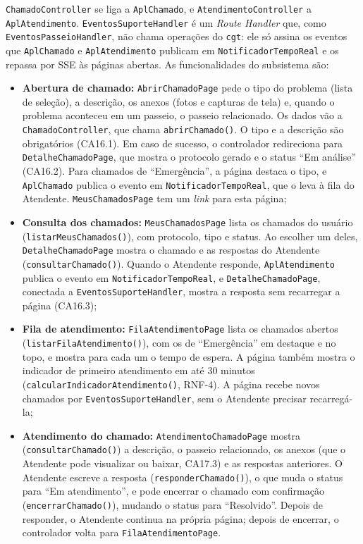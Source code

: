 \begin{sloppypar}
\texttt{ChamadoController} se liga a \texttt{AplChamado}, e \texttt{AtendimentoController} a \texttt{AplAtendimento}. \texttt{EventosSuporteHandler} é um \textit{Route Handler} que, como \texttt{EventosPasseioHandler}, não chama operações do \texttt{cgt}: ele só assina os eventos que \texttt{AplChamado} e \texttt{AplAtendimento} publicam em \texttt{NotificadorTempoReal} e os repassa por SSE às páginas abertas. As funcionalidades do subsistema são:

\begin{itemize}
	\item \textbf{Abertura de chamado:} \texttt{AbrirChamadoPage} pede o tipo do problema (lista de seleção), a descrição, os anexos (fotos e capturas de tela) e, quando o problema aconteceu em um passeio, o passeio relacionado. Os dados vão a \texttt{ChamadoController}, que chama \texttt{abrirChamado()}. O tipo e a descrição são obrigatórios (CA16.1). Em caso de sucesso, o controlador redireciona para \texttt{DetalheChamadoPage}, que mostra o protocolo gerado e o status ``Em análise'' (CA16.2). Para chamados de ``Emergência'', a página destaca o tipo, e \texttt{AplChamado} publica o evento em \texttt{NotificadorTempoReal}, que o leva à fila do Atendente. \texttt{MeusChamadosPage} tem um \textit{link} para esta página;
	\item \textbf{Consulta dos chamados:} \texttt{MeusChamadosPage} lista os chamados do usuário (\texttt{listarMeusChamados()}), com protocolo, tipo e status. Ao escolher um deles, \texttt{DetalheChamadoPage} mostra o chamado e as respostas do Atendente (\texttt{consultarChamado()}). Quando o Atendente responde, \texttt{AplAtendimento} publica o evento em \texttt{NotificadorTempoReal}, e \texttt{DetalheChamadoPage}, conectada a \texttt{EventosSuporteHandler}, mostra a resposta sem recarregar a página (CA16.3);
	\item \textbf{Fila de atendimento:} \texttt{FilaAtendimentoPage} lista os chamados abertos (\texttt{listarFilaAtendimento()}), com os de ``Emergência'' em destaque e no topo, e mostra para cada um o tempo de espera. A página também mostra o indicador de primeiro atendimento em até 30 minutos (\texttt{calcularIndicadorAtendimento()}, RNF-4). A página recebe novos chamados por \texttt{EventosSuporteHandler}, sem o Atendente precisar recarregá-la;
	\item \textbf{Atendimento do chamado:} \texttt{AtendimentoChamadoPage} mostra (\texttt{consultarChamado()}) a descrição, o passeio relacionado, os anexos (que o Atendente pode visualizar ou baixar, CA17.3) e as respostas anteriores. O Atendente escreve a resposta (\texttt{responderChamado()}), o que muda o status para ``Em atendimento'', e pode encerrar o chamado com confirmação (\texttt{encerrarChamado()}), mudando o status para ``Resolvido''. Depois de responder, o Atendente continua na própria página; depois de encerrar, o controlador volta para \texttt{FilaAtendimentoPage}.
\end{itemize}
\end{sloppypar}



